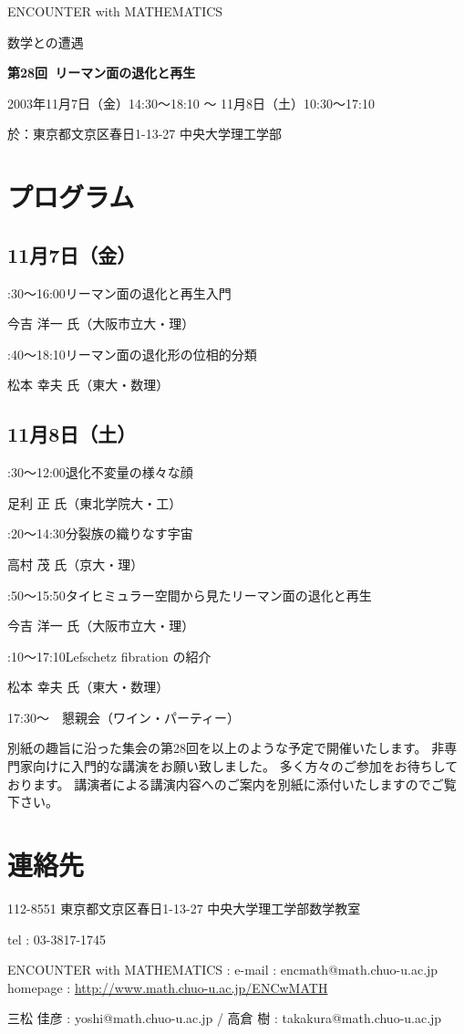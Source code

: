 \documentclass[uplatex,dvipdfmx]{jlreq}
\newcommand{\talk}[3]{%
\noindent
#1\quad #2\par
\hspace*{2em}#3\par\smallskip
}
\newcommand{\EwMnumber}{第28回}
\newcommand{\EwMtitle}{リーマン面の退化と再生}
\newcommand{\EwMdate}{2003年11月7日（金）14:30～18:10 ～ 11月8日（土）10:30～17:10}
\newcommand{\EwMplace}{東京都文京区春日1-13-27 中央大学理工学部}
\newcommand{\EwMtitleblock}{

\vspace*{-5mm}

\begin{center}

{\Large ENCOUNTER with MATHEMATICS}

\vspace{2mm}

{\large 数学との遭遇}

\vspace{4mm}

{\Large \bfseries \EwMnumber\ \EwMtitle}

\vspace{4mm}

\EwMdate

\vspace{2mm}

於：\EwMplace

\end{center}

\vspace{2mm}

}
\begin{document}
\EwMtitleblock


\section*{プログラム}

\subsection*{11月7日（金）}

\talk
{14:30～16:00}
{リーマン面の退化と再生入門}
{今吉 洋一 氏（大阪市立大・理）}

\talk
{16:40～18:10}
{リーマン面の退化形の位相的分類}
{松本 幸夫 氏（東大・数理）}

\subsection*{11月8日（土）}

\talk
{10:30～12:00}
{退化不変量の様々な顔}
{足利 正 氏（東北学院大・工）}

\talk
{13:20～14:30}
{分裂族の織りなす宇宙}
{高村 茂 氏（京大・理）}

\talk
{14:50～15:50}
{タイヒミュラー空間から見たリーマン面の退化と再生}
{今吉 洋一 氏（大阪市立大・理）}

\talk
{16:10～17:10}
{Lefschetz fibration の紹介}
{松本 幸夫 氏（東大・数理）}

\bigskip

17:30～　懇親会（ワイン・パーティー）


\bigskip

別紙の趣旨に沿った集会の第28回を以上のような予定で開催いたします。  
非専門家向けに入門的な講演をお願い致しました。  
多く方々のご参加をお待ちしております。  
講演者による講演内容へのご案内を別紙に添付いたしますのでご覧下さい。


\section*{連絡先}

112-8551 東京都文京区春日1-13-27 中央大学理工学部数学教室 

tel : 03-3817-1745  

ENCOUNTER with MATHEMATICS : e-mail : encmath@math.chuo-u.ac.jp  
homepage : \url{http://www.math.chuo-u.ac.jp/ENCwMATH}  

三松 佳彦 : yoshi@math.chuo-u.ac.jp / 高倉 樹 : takakura@math.chuo-u.ac.jp
\end{document}
